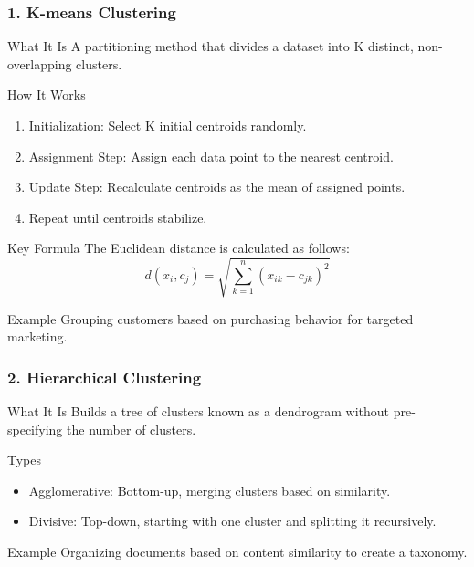\documentclass[aspectratio=169]{beamer}
\begin{document}
\begin{frame}[fragile]
    \frametitle{1. K-means Clustering}
    \begin{block}{What It Is}
        A partitioning method that divides a dataset into K distinct, non-overlapping clusters.
    \end{block}
    
    \begin{block}{How It Works}
        \begin{enumerate}
            \item Initialization: Select K initial centroids randomly.
            \item Assignment Step: Assign each data point to the nearest centroid.
            \item Update Step: Recalculate centroids as the mean of assigned points.
            \item Repeat until centroids stabilize.
        \end{enumerate}
    \end{block}

    \begin{block}{Key Formula}
        The Euclidean distance is calculated as follows:
        \begin{equation}
            d(x_i, c_j) = \sqrt{\sum_{k=1}^{n}(x_{ik} - c_{jk})^2}
        \end{equation}
    \end{block}

    \begin{block}{Example}
        Grouping customers based on purchasing behavior for targeted marketing.
    \end{block}
\end{frame}

\begin{frame}[fragile]
    \frametitle{2. Hierarchical Clustering}
    \begin{block}{What It Is}
        Builds a tree of clusters known as a dendrogram without pre-specifying the number of clusters.
    \end{block}

    \begin{block}{Types}
        \begin{itemize}
            \item Agglomerative: Bottom-up, merging clusters based on similarity.
            \item Divisive: Top-down, starting with one cluster and splitting it recursively.
        \end{itemize}
    \end{block}

    \begin{block}{Example}
        Organizing documents based on content similarity to create a taxonomy.
    \end{block}
\end{frame}
\end{document}
